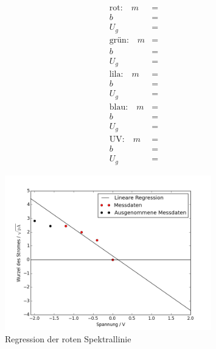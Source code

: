 \begin{align*}
	\text{rot:} \quad m &=  \\
	b &=  \\
	U_g &=  \\[1em]
	\text{grün:} \quad m &=  \\
	b &=  \\
	U_g &=  \\[1em]
	\text{lila:} \quad m &=  \\
	b &=  \\
	U_g &=  \\[1em]
	\text{blau:} \quad m &=  \\
	b &=  \\
	U_g &=  \\[1em]
	\text{UV:} \quad m &=  \\
	b &=  \\
	U_g &= 
\end{align*}












\begin{figure}[h!]
	\centering
	\includegraphics[width=0.8\textwidth]{build/regression_Farbe:0.png}
	\caption{Regression der roten Spektrallinie}
	\label{fig:regression_rot}
\end{figure}

